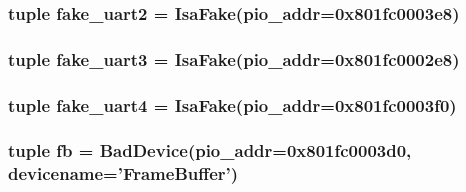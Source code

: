 \label{classTsunami_1_1Tsunami_a729c2a5c6baea4c0fdd2de7da0a9ce84}
\hypertarget{classTsunami_1_1Tsunami_a5055b407ff1689f84877a5a30c3b8c0b}{
\subsubsection[{fake\_\-uart2}]{\setlength{\rightskip}{0pt plus 5cm}tuple {\bf fake\_\-uart2} = {\bf IsaFake}(pio\_\-addr=0x801fc0003e8)}}
\label{classTsunami_1_1Tsunami_a5055b407ff1689f84877a5a30c3b8c0b}
\hypertarget{classTsunami_1_1Tsunami_ab33d23184cd2f845e4bdeb569b938f4b}{
\subsubsection[{fake\_\-uart3}]{\setlength{\rightskip}{0pt plus 5cm}tuple {\bf fake\_\-uart3} = {\bf IsaFake}(pio\_\-addr=0x801fc0002e8)}}
\label{classTsunami_1_1Tsunami_ab33d23184cd2f845e4bdeb569b938f4b}
\hypertarget{classTsunami_1_1Tsunami_adad25ad3019493d124ac17ae6fab5e9c}{
\subsubsection[{fake\_\-uart4}]{\setlength{\rightskip}{0pt plus 5cm}tuple {\bf fake\_\-uart4} = {\bf IsaFake}(pio\_\-addr=0x801fc0003f0)}}
\label{classTsunami_1_1Tsunami_adad25ad3019493d124ac17ae6fab5e9c}
\hypertarget{classTsunami_1_1Tsunami_ab69ff40cdffeeb758945921ff6accded}{
\subsubsection[{fb}]{\setlength{\rightskip}{0pt plus 5cm}tuple {\bf fb} = {\bf BadDevice}(pio\_\-addr=0x801fc0003d0, devicename='FrameBuffer')}}
